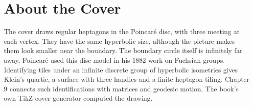 \backmatter
\cleardoublepage
\chapter*{About the Cover}
\noindent The cover draws regular heptagons in the Poincaré disc, with three meeting at each vertex. They have the same hyperbolic size, although the picture makes them look smaller near the boundary. The boundary circle itself is infinitely far away. Poincaré used this disc model in his 1882 work on Fuchsian groups. Identifying tiles under an infinite discrete group of hyperbolic isometries gives Klein’s quartic, a surface with three handles and a finite heptagon tiling. Chapter 9 connects such identifications with matrices and geodesic motion. The book's own TikZ cover generator computed the drawing.
